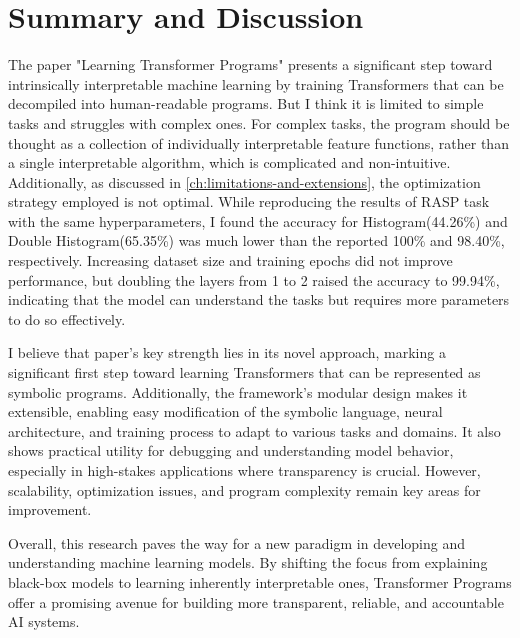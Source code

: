 
\section{Summary and Discussion}
\label{ch:summary-and-discussion}


The paper "Learning Transformer Programs" presents a significant step toward intrinsically interpretable machine learning by training Transformers that can be decompiled into  human-readable programs. But I think it is limited to simple tasks and struggles with complex ones. For complex tasks, the program should be thought as a collection of individually interpretable feature functions, rather than a single interpretable algorithm, which is complicated and non-intuitive. Additionally, as discussed in \cref{ch:limitations-and-extensions}, the optimization strategy employed is not optimal. While reproducing the results of RASP task with the same hyperparameters, I found the accuracy for Histogram(44.26\%) and Double Histogram(65.35\%) was much lower than the reported 100\% and 98.40\%, respectively. Increasing dataset size and training epochs did not improve performance, but doubling the layers from 1 to 2 raised the accuracy to 99.94\%, indicating that the model can understand the tasks but requires more parameters to do so effectively.

I believe that paper's key strength lies in its novel approach, marking a significant first step toward learning Transformers that can be represented as symbolic programs. Additionally, the framework's modular design makes it extensible, enabling easy modification of the symbolic language, neural architecture, and training process to adapt to various tasks and domains. It also shows practical utility for debugging and understanding model behavior, especially in high-stakes applications where transparency is crucial. However, scalability, optimization issues, and program complexity remain key areas for improvement.

Overall, this research paves the way for a new paradigm in developing and understanding machine learning models. By shifting the focus from explaining black-box models to learning inherently interpretable ones, Transformer Programs offer a promising avenue for building more transparent, reliable, and accountable AI systems.


